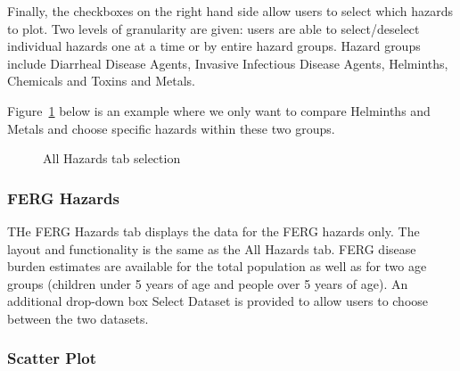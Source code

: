 \documentclass[
  letterpaper,
  DIV=11,
  numbers=noendperiod]{scrartcl}
\begin{document}
Finally, the checkboxes on the right hand side allow users to select
which hazards to plot. Two levels of granularity are given: users are
able to select/deselect individual hazards one at a time or by entire
hazard groups. Hazard groups include Diarrheal Disease Agents, Invasive
Infectious Disease Agents, Helminths, Chemicals and Toxins and Metals.

Figure~\ref{fig-allhazards_select} below is an example where we only
want to compare Helminths and Metals and choose specific hazards within
these two groups.

\begin{figure}


\caption{\label{fig-allhazards_select}All Hazards tab selection}

\end{figure}%

\subsubsection{FERG Hazards}\label{ferg-hazards}

THe FERG Hazards tab displays the data for the FERG hazards only. The
layout and functionality is the same as the All Hazards tab. FERG
disease burden estimates are available for the total population as well
as for two age groups (children under 5 years of age and people over 5
years of age). An additional drop-down box Select Dataset is provided to
allow users to choose between the two datasets.

\subsubsection{Scatter Plot}\label{scatter-plot}
\end{document}
